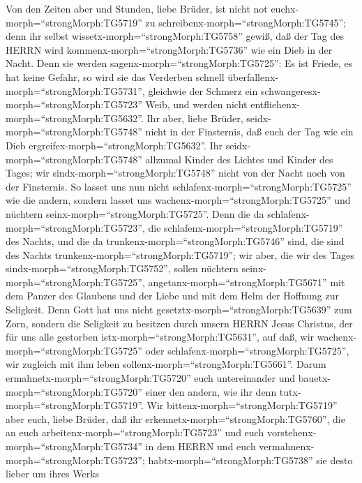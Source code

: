  Von den Zeiten aber und Stunden, liebe Brüder, ist nicht
not euchx-morph=``strongMorph:TG5719'' zu
schreibenx-morph=``strongMorph:TG5745'';  denn ihr selbst
wissetx-morph=``strongMorph:TG5758'' gewiß, daß der Tag des HERRN wird
kommenx-morph=``strongMorph:TG5736'' wie ein Dieb in der Nacht.
 Denn sie werden sagenx-morph=``strongMorph:TG5725'': Es ist
Friede, es hat keine Gefahr, so wird sie das Verderben schnell
überfallenx-morph=``strongMorph:TG5731'', gleichwie der Schmerz ein
schwangeresx-morph=``strongMorph:TG5723'' Weib, und werden nicht
entfliehenx-morph=``strongMorph:TG5632''.  Ihr aber, liebe
Brüder, seidx-morph=``strongMorph:TG5748'' nicht in der Finsternis, daß
euch der Tag wie ein Dieb ergreifex-morph=``strongMorph:TG5632''.
 Ihr seidx-morph=``strongMorph:TG5748'' allzumal Kinder des
Lichtes und Kinder des Tages; wir sindx-morph=``strongMorph:TG5748''
nicht von der Nacht noch von der Finsternis.  So lasset uns
nun nicht schlafenx-morph=``strongMorph:TG5725'' wie die andern, sondern
lasset uns wachenx-morph=``strongMorph:TG5725'' und nüchtern
seinx-morph=``strongMorph:TG5725''.  Denn die da
schlafenx-morph=``strongMorph:TG5723'', die
schlafenx-morph=``strongMorph:TG5719'' des Nachts, und die da
trunkenx-morph=``strongMorph:TG5746'' sind, die sind des Nachts
trunkenx-morph=``strongMorph:TG5719'';  wir aber, die wir
des Tages sindx-morph=``strongMorph:TG5752'', sollen nüchtern
seinx-morph=``strongMorph:TG5725'',
angetanx-morph=``strongMorph:TG5671'' mit dem Panzer des Glaubens und
der Liebe und mit dem Helm der Hoffnung zur Seligkeit.  Denn
Gott hat uns nicht gesetztx-morph=``strongMorph:TG5639'' zum Zorn,
sondern die Seligkeit zu besitzen durch unsern HERRN Jesus Christus,
 der für uns alle gestorben
istx-morph=``strongMorph:TG5631'', auf daß, wir
wachenx-morph=``strongMorph:TG5725'' oder
schlafenx-morph=``strongMorph:TG5725'', wir zugleich mit ihm leben
sollenx-morph=``strongMorph:TG5661''.  Darum
ermahnetx-morph=``strongMorph:TG5720'' euch untereinander und
bauetx-morph=``strongMorph:TG5720'' einer den andern, wie ihr denn
tutx-morph=``strongMorph:TG5719''.  Wir
bittenx-morph=``strongMorph:TG5719'' aber euch, liebe Brüder, daß ihr
erkennetx-morph=``strongMorph:TG5760'', die an euch
arbeitenx-morph=``strongMorph:TG5723'' und euch
vorstehenx-morph=``strongMorph:TG5734'' in dem HERRN und euch
vermahnenx-morph=``strongMorph:TG5723''; 
habtx-morph=``strongMorph:TG5738'' sie desto lieber um ihres Werks

